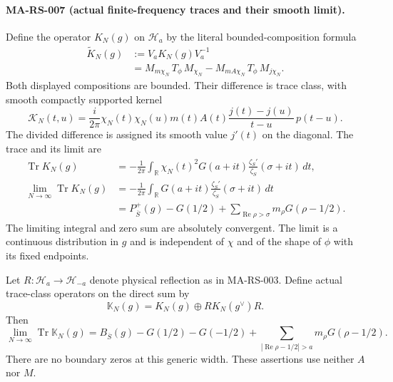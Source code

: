 \paragraph{MA-RS-007 (actual finite-frequency traces and their smooth limit).}
Define the operator $K_N(g)$ on $\mathcal H_a$ by the literal
bounded-composition formula
\[
 \begin{split}
 \widetilde K_N(g)&:=V_aK_N(g)V_a^{-1}\\
  &=M_{m\chi_N}\,T_\phi\,M_{\chi_N}
       -M_{mA\chi_N}\,T_\phi\,M_{j\chi_N}.
 \end{split}
 \tag{MA-RS.54}
\]
Both displayed compositions are bounded. Their difference is trace
class, with smooth compactly supported kernel
\[
 \mathcal K_N(t,u)
   =\frac{i}{2\pi}\chi_N(t)\chi_N(u)m(t)A(t)
          \frac{j(t)-j(u)}{t-u}\,p(t-u).
 \tag{MA-RS.55}
\]
The divided difference is assigned its smooth value $j'(t)$
on the diagonal. The trace and its limit are
\[
 \begin{aligned}
 \operatorname{Tr}K_N(g)
   &=-\frac1{2\pi}\int_{\mathbb R}\chi_N(t)^2G(a+it)
                    \frac{\zeta_S'}{\zeta_S}(\sigma+it)\,dt,\\
 \lim_{N\to\infty}\operatorname{Tr}K_N(g)
   &=-\frac1{2\pi}\int_{\mathbb R}G(a+it)
                    \frac{\zeta_S'}{\zeta_S}(\sigma+it)\,dt\\
   &=P_{\overline S}^{+}(g)-G(1/2)
       +\sum_{\operatorname{Re}\rho>\sigma}
                      m_\rho G(\rho-1/2).
 \end{aligned}
 \tag{MA-RS.56}
\]
The limiting integral and zero sum are absolutely convergent.
The limit is a continuous distribution in $g$ and is independent
of $\chi$ and of the shape of $\phi$ with its fixed endpoints.

Let $R:\mathcal H_a\longrightarrow\mathcal H_{-a}$ denote
physical reflection as in MA-RS-003. Define actual trace-class
operators on the direct sum by
\[
 \mathbb K_N(g)=K_N(g)\oplus R K_N(g^\vee)R.
 \tag{MA-RS.57}
\]
Then
\[
 \lim_{N\to\infty}\operatorname{Tr}\mathbb K_N(g)
   =B_{\overline S}(g)-G(1/2)-G(-1/2)
       +\sum_{|\operatorname{Re}\rho-1/2|>a}
                         m_\rho G(\rho-1/2).
 \tag{MA-RS.58}
\]
There are no boundary zeros at this generic width. These assertions
use neither $A$ nor $M$.

